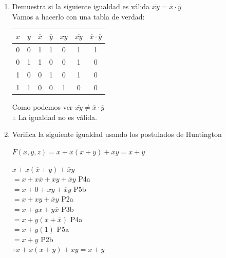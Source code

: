 \documentclass[a4paper,12pt]{article}
\begin{document}
\begin{enumerate}[label=\textcolor{teal}{\textbf{\arabic*.}}]
    \item  Demuestra si la siguiente igualdad es válida $\overline{xy}=\overline{x} \cdot \overline{y}$\\
    Vamos a hacerlo con una tabla de verdad:\\
    \begin{center}
        \begin{tabular}{|c|c|c|c|c|c|c|}
            \hline
            $x$ & $y$ & $\overline{x}$ & $\overline{y}$ & $xy$ & $\overline{xy}$ & $\overline{x} \cdot \overline{y}$ \\ \hline
            0 & 0 & 1 & 1 & 0 & 1 & 1 \\ \hline
            0 & 1 & 1 & 0 & 0 & 1 & 0 \\ \hline
            1 & 0 & 0 & 1 & 0 & 1 & 0 \\ \hline
            1 & 1 & 0 & 0 & 1 & 0 & 0 \\ \hline
        \end{tabular}
    \end{center}
    Como podemos ver $\overline{xy} \neq \overline{x} \cdot \overline{y}$\\
    $\therefore$ La igualdad no es válida.  
        
        

    \item Verifica la siguiente igualdad usando los postulados de Huntington
            \begin{center}
                $F(x,y,z) = x + x(\overline{x} + y) + \overline{x} y = x + y$
            \end{center}

            $x + x(\overline{x} + y) + \overline{x} y$\\
            $= x + x\overline{x} + xy + \overline{x} y$ P4a\\
            $= x + 0 + xy + \overline{x} y$ P5b\\
            $= x + xy + \overline{x} y$ P2a\\
            $= x + yx + y\overline{x} $ P3b\\
            $= x + y(x + \overline{x}) $ P4a\\
            $= x + y(1) $ P5a\\
            $= x + y $ P2b\\

            $ \therefore x + x(\overline{x} + y) + \overline{x} y = x + y$\\
           

\end{enumerate}
\end{document}
